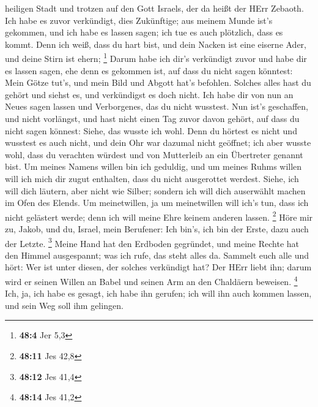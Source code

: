 heiligen Stadt und trotzen auf den Gott Israels, der da heißt der HErr
Zebaoth.  Ich habe es zuvor verkündigt, dies Zukünftige; aus
meinem Munde ist's gekommen, und ich habe es lassen sagen; ich tue es
auch plötzlich, dass es kommt.  Denn ich weiß, dass du hart
bist, und dein Nacken ist eine eiserne Ader, und deine Stirn ist ehern;
\footnote{\textbf{48:4} Jer 5,3}  Darum habe ich dir's
verkündigt zuvor und habe dir es lassen sagen, ehe denn es gekommen ist,
auf dass du nicht sagen könntest: Mein Götze tut's, und mein Bild und
Abgott hat's befohlen.  Solches alles hast du gehört und
siehst es, und verkündigst es doch nicht. Ich habe dir von nun an Neues
sagen lassen und Verborgenes, das du nicht wusstest.  Nun
ist's geschaffen, und nicht vorlängst, und hast nicht einen Tag zuvor
davon gehört, auf dass du nicht sagen könnest: Siehe, das wusste ich
wohl.  Denn du hörtest es nicht und wusstest es auch nicht,
und dein Ohr war dazumal nicht geöffnet; ich aber wusste wohl, dass du
verachten würdest und von Mutterleib an ein Übertreter genannt bist.
 Um meines Namens willen bin ich geduldig, und um meines
Ruhms willen will ich mich dir zugut enthalten, dass du nicht
ausgerottet werdest.  Siehe, ich will dich läutern, aber
nicht wie Silber; sondern ich will dich auserwählt machen im Ofen des
Elends.  Um meinetwillen, ja um meinetwillen will ich's
tun, dass ich nicht gelästert werde; denn ich will meine Ehre keinem
anderen lassen. \footnote{\textbf{48:11} Jes 42,8}  Höre
mir zu, Jakob, und du, Israel, mein Berufener: Ich bin's, ich bin der
Erste, dazu auch der Letzte. \footnote{\textbf{48:12} Jes 41,4}
 Meine Hand hat den Erdboden gegründet, und meine Rechte
hat den Himmel ausgespannt; was ich rufe, das steht alles da.
 Sammelt euch alle und hört: Wer ist unter diesen, der
solches verkündigt hat? Der HErr liebt ihn; darum wird er seinen Willen
an Babel und seinen Arm an den Chaldäern beweisen. \footnote{\textbf{48:14}
  Jes 41,2}  Ich, ja, ich habe es gesagt, ich habe ihn
gerufen; ich will ihn auch kommen lassen, und sein Weg soll ihm
gelingen.

